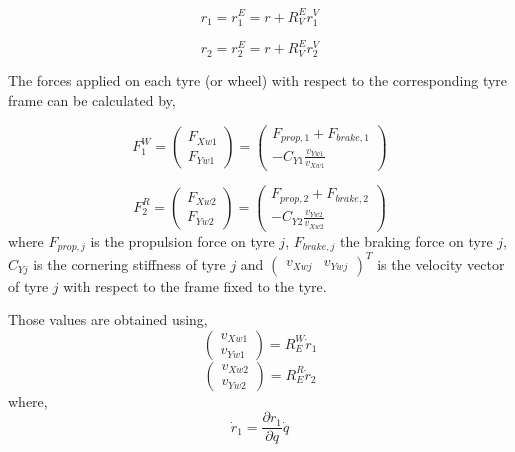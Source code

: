\documentclass[12pt]{article}
\begin{document}
\begin{equation}
    r_1 = r_1^E =r + R^E_V r^V_1     
\end{equation}

\begin{equation}
    r_2 = r_2^E = r+ R^E_V r^V_2
\end{equation}

The forces applied on each tyre (or wheel) with respect to the corresponding tyre frame can be calculated by,

\begin{equation}
    F_1^W =  \begin{pmatrix} F_{Xw1} \\ F_{Yw1} \end{pmatrix}  = \begin{pmatrix}  F_{prop,1} + F_{brake,1} \\  - C_{Y1} \frac{v_{Yw1}}{v_{Xw1}}\end{pmatrix} 
\end{equation}

\begin{equation}
    F_2^R = \begin{pmatrix} F_{Xw2} \\ F_{Yw2} \end{pmatrix} = \begin{pmatrix} F_{prop,2} + F_{brake,2} \\  - C_{Y2} \frac{v_{Yw2}}{v_{Xw2}}\end{pmatrix}
\end{equation}
where $F_{prop,j}$ is the propulsion force on tyre $j$, $F_{brake,j}$ the braking force on tyre $j$, $C_{Yj}$ is the cornering stiffness of tyre $j$ and $\begin{pmatrix} v_{Xwj} & v_{Ywj} \end{pmatrix}^T$ is the velocity vector of tyre $j$ with respect to the frame fixed to the tyre.

Those values are obtained using,
\begin{equation}
    \begin{pmatrix} v_{Xw1} \\ v_{Yw1} \end{pmatrix} = R^W_E \dot{r}_1
\end{equation}
\begin{equation}
    \begin{pmatrix} v_{Xw2} \\ v_{Yw2} \end{pmatrix} = R^R_E \dot{r}_2
\end{equation}
where,
\begin{equation}
    \dot{r}_1 = \frac{\partial r_1}{\partial q} \dot{q}
\end{equation}
\end{document}
